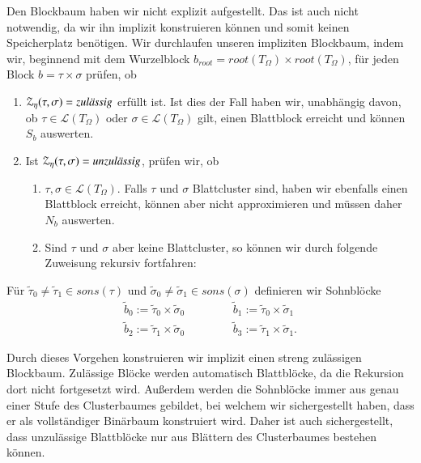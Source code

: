     Den Blockbaum haben wir nicht explizit aufgestellt. Das ist auch nicht notwendig, da wir ihn implizit konstruieren können und somit keinen Speicherplatz benötigen.
    Wir durchlaufen unseren impliziten Blockbaum, indem wir, beginnend mit dem Wurzelblock $b_{root} = root(T_\Omega) \times root(T_\Omega)$, für jeden Block $b = \tau \times \sigma$ prüfen, ob
    \begin{enumerate}
      \item $\mathcal{Z}_\eta(\tau,\sigma) = \text{\textit{zulässig}}$ erfüllt ist. Ist dies der Fall haben wir, unabhängig davon, ob $\tau \in \mathcal{L}(T_\Omega)$ oder 
      $\sigma \in \mathcal{L}(T_\Omega)$ gilt, einen Blattblock erreicht und können $S_b$ auswerten. 
      \item Ist $\mathcal{Z}_\eta(\tau,\sigma) = \text{\textit{unzulässig}}$, prüfen wir, ob 
      \begin{enumerate}
	\item $\tau, \sigma \in \mathcal{L}(T_\Omega)$. Falls $\tau$ und $\sigma$ Blattcluster sind, haben wir ebenfalls einen Blattblock erreicht, können aber nicht approximieren und müssen
	daher $N_b$ auswerten.
	\item Sind $\tau$ und $\sigma$ aber keine Blattcluster, so können wir durch folgende Zuweisung rekursiv fortfahren:	
      \end{enumerate}
    \end{enumerate}
    Für $\tilde \tau_0 \neq \tilde \tau_1 \in sons(\tau)$ und $\tilde \sigma_0 \neq \tilde \sigma_1 \in sons(\sigma)$ definieren wir Sohnblöcke
    \begin{align*}
      \tilde b_0 := \tilde \tau_0 \times \tilde \sigma_0 & \ \ \ \ \ \ \ \ \ \ \ \ & \tilde b_1 := \tilde \tau_0 \times \tilde \sigma_1\\
      \tilde b_2 := \tilde \tau_1 \times \tilde \sigma_0 & \ \ \ \ \ \ \ \ \ \ \ \ & \tilde b_3 := \tilde \tau_1 \times \tilde \sigma_1.
    \end{align*}
    
    Durch dieses Vorgehen konstruieren wir implizit einen streng zulässigen Blockbaum. Zulässige Blöcke werden automatisch Blattblöcke, da die Rekursion dort nicht fortgesetzt wird.
    Außerdem werden die Sohnblöcke immer aus genau einer Stufe des Clusterbaumes gebildet, bei welchem wir sichergestellt haben, dass er als vollständiger Binärbaum konstruiert wird. 
    Daher ist auch sichergestellt, dass unzulässige Blattblöcke nur aus Blättern des Clusterbaumes bestehen können.
    
